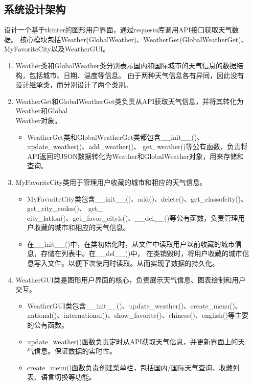 \documentclass[UTF8]{ctexart}
\begin{document}
\subsection{系统设计架构}
设计一个基于tkinter的图形用户界面，通过requests库调用API接口获取天气数据。
核心模块包括Weather(GlobalWeather)、WeatherGet(GlobalWeatherGet)、MyFavoriteCity以及WeatherGUI。
\begin{enumerate}[1.]
   \item Weather类和GlobalWeather类分别表示国内和国际城市的天气信息的数据结构，包括城市、日期、温度等信息。
         由于两种天气信息各有异同，因此没有设计继承类，而分别设计了两个类别。
   \item WeatherGet和GlobalWeatherGet类负责从API获取天气信息，并将其转化为Weather和Global\\Weather对象。
         \begin{itemize}
            \item WeatherGet类和GlobalWeatherGet类都包含\_\_init\_\_()、update\_weather()、add\_weather()、
                  get\_weather()等公有函数，负责将API返回的JSON数据转化为Weather和GlobalWeather对象，用来存储和查询。
         \end{itemize}
   \item MyFavoriteCity类用于管理用户收藏的城市和相应的天气信息。
         \begin{itemize}
            \item MyFavoriteCity类包含\_\_init\_\_()、add()、delete()、get\_classofcity()、get\_city\_codes()、
                  get\_\\city\_latlon()、get\_favor\_cityls()、\_\_del\_\_()等公有函数，负责管理用户收藏的城市和相应的天气信息。
            \item 在\_\_init\_\_()中，在类初始化时，从文件中读取用户以前收藏的城市信息，存储在列表中。在\_\_del\_\_()中，
                  在类销毁时，将用户收藏的城市信息写入文件。以便下次使用时读取。从而实现了数据的持久化。
         \end{itemize}
   \item WeatherGUI类是图形用户界面的核心，负责展示天气信息、图表绘制和用户交互。
         \begin{itemize}
            \item WeatherGUI类包含\_\_init\_\_()、update\_weather()、create\_menu()、national()、international()、show\_favorite()、chinese()、english()等主要的公有函数。
            \item update\_weather()函数负责定时从API获取天气信息，并更新界面上的天气信息。保证数据的实时性。
            \item create\_menu()函数负责创建菜单栏，包括国内/国际天气查询、收藏列表、语言切换等功能。

\end{itemize}
\end{enumerate}
\end{document}
